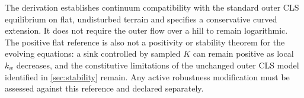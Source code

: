 The derivation establishes continuum compatibility with the
standard outer CLS equilibrium on flat, undisturbed terrain and
specifies a conservative curved extension. It does not require
the outer flow over a hill to remain logarithmic. The positive
flat reference is also not a positivity or stability theorem for
the evolving equations: a sink controlled by sampled $K$ can
remain positive as local $k_w$ decreases, and the constitutive
limitations of the unchanged outer CLS model identified in
\cref{sec:stability} remain. Any active robustness modification
must be assessed against this reference and declared separately.
